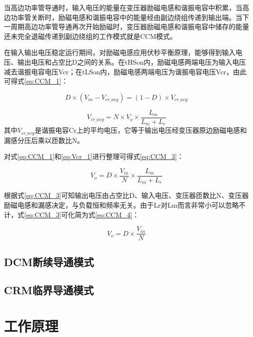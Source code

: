 当高边功率管导通时，输入电压的能量在变压器励磁电感和谐振电容中积累，当高边功率管关断时，励磁电感和谐振电容中的能量经由副边绕组传递到输出端。当下一周期高边功率管导通再次开始励磁时，变压器励磁电感和谐振电容中储存的能量还未完全退磁传递到副边绕组的工作模式就是CCM模式。

在输入输出电压稳定运行期间，对励磁电感应用伏秒平衡原理，能够得到输入电压、输出电压和占空比D之间的关系。在tHSon内，励磁电感两端电压为输入电压减去谐振电容电压Vcr；在tLSon内，励磁电感两端电压为谐振电容电压Vcr，由此可得式\eqref{eq:CCM_1}：

\begin{equation}
    \label{eq:CCM_1}
    D\times(V_{in}−V_{cr\_avg})=(1−D)\times V_{cr\_avg}
\end{equation}

\begin{equation}
    \label{eq:Vcr_1}
    V_{cr\_avg}=N \times V_o\times\frac{L_m}{L_m+L_r}
\end{equation}
其中$V_{cr\_avg}$是谐振电容Cr上的平均电压，它等于输出电压经变压器原边励磁电感和漏感分压后乘以匝数比N。

对式\eqref{eq:CCM_1}和\eqref{eq:Vcr_1}进行整理可得式\eqref{eq:CCM_3}：

\begin{equation}
    \label{eq:CCM_3}
    V_o=D \times \frac{V_{in}}{N} \times\frac{L_m}{L_m+L_r}  
\end{equation}

根据式\eqref{eq:CCM_3}可知输出电压由占空比D、输入电压、变压器匝数比N、变压器励磁电感和漏感决定，与负载恒和频率无关。由于Lr对Lm而言非常小可以忽略不计，式\eqref{eq:CCM_3}可化简为式\eqref{eq:CCM_4}：

\begin{equation}
    \label{eq:CCM_4}
    V_o=D \times \frac{V_{in}}{N}  
\end{equation}

\subsection{DCM断续导通模式}




\subsection{CRM临界导通模式}


\section{工作原理}

